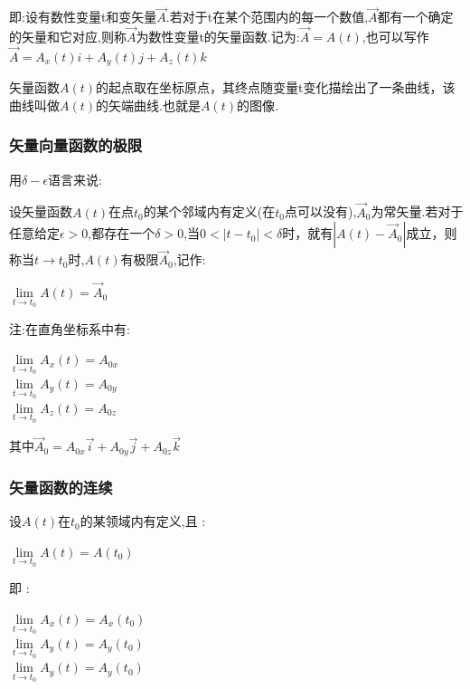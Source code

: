 \documentclass[UTF8,12pt]{ctexbook}
\newcommand{\limNormal}[1]{\lim\limits_{#1}}
\begin{document}
{{{{{      即:设有数性变量t和变矢量$\vec{A}$.若对于t在某个范围内的每一个数值,$\vec{A}$都有一个确定的矢量和它对应,则称$\vec{A}$为数性变量t的矢量函数.记为:$\vec{A} = A(t)$,也可以写作$\vec{A} = A_x(t)i + A_y(t)j + A_z(t)k$

      矢量函数$A(t)$的起点取在坐标原点，其终点随变量t变化描绘出了一条曲线，该曲线叫做$A(t)$的矢端曲线.也就是$A(t)$的图像.
    }%

    \subsubsection{矢量向量函数的极限}{
      用$\delta-\epsilon$语言来说:

      设矢量函数$A(t)$在点$t_0$的某个邻域内有定义(在$t_0$点可以没有),$\vec{A}_0$为常矢量.若对于任意给定$\epsilon > 0$,都存在一个$\delta > 0$,当$0 < |t - t_0| < \delta$时，就有$|A(t) - \vec{A}_0|$成立，则称当$t \to t_0$时,$A(t)$有极限$\vec{A}_0$,记作:

      \begin{center}
        $\limNormal{t \to t_0}A(t) = \vec{A}_0$
      \end{center}

      注:在直角坐标系中有:

      \begin{center}
        $\limNormal{t \to t_0}A_x(t) = A_{0x}$ \\
        $\limNormal{t \to t_0}A_y(t) = A_{0y}$ \\
        $\limNormal{t \to t_0}A_z(t) = A_{0z}$
      \end{center}

      其中$\vec{A}_0 = A_{0x}\vec{i} + A_{0y}\vec{j} + A_{0z}\vec{k}$
    }%

    \subsubsection{矢量函数的连续}{
      设$A(t)$在$t_0$的某领域内有定义,且 :

      \begin{center}
        $\limNormal{t \to t_0}A(t) = A(t_0)$
      \end{center}

      即 :

      \begin{center}
        $\limNormal{t \to t_0}A_x(t) = A_x(t_0)$ \\
        $\limNormal{t \to t_0}A_y(t) = A_y(t_0)$ \\
        $\limNormal{t \to t_0}A_y(t) = A_y(t_0)$
      \end{center}

}}}}}
\end{document}
